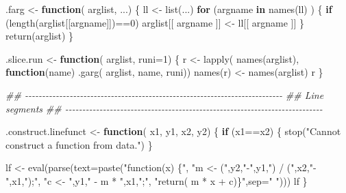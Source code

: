 \documentclass[
  letterpaper,
  DIV=11,
  numbers=noendperiod]{scrartcl}
\newenvironment{Shaded}{\begin{snugshade}}{\end{snugshade}}
\newcommand{\AttributeTok}[1]{\textcolor[rgb]{0.40,0.45,0.13}{#1}}
\newcommand{\ControlFlowTok}[1]{\textcolor[rgb]{0.00,0.23,0.31}{\textbf{#1}}}
\newcommand{\DecValTok}[1]{\textcolor[rgb]{0.68,0.00,0.00}{#1}}
\newcommand{\DocumentationTok}[1]{\textcolor[rgb]{0.37,0.37,0.37}{\textit{#1}}}
\newcommand{\FunctionTok}[1]{\textcolor[rgb]{0.28,0.35,0.67}{#1}}
\newcommand{\NormalTok}[1]{\textcolor[rgb]{0.00,0.23,0.31}{#1}}
\newcommand{\OtherTok}[1]{\textcolor[rgb]{0.00,0.23,0.31}{#1}}
\newcommand{\SpecialCharTok}[1]{\textcolor[rgb]{0.37,0.37,0.37}{#1}}
\newcommand{\StringTok}[1]{\textcolor[rgb]{0.13,0.47,0.30}{#1}}
\begin{document}
\begin{Shaded}
\begin{Highlighting}[]
\NormalTok{.farg }\OtherTok{\textless{}{-}} \ControlFlowTok{function}\NormalTok{( arglist, ...) \{}
\NormalTok{    ll }\OtherTok{\textless{}{-}} \FunctionTok{list}\NormalTok{(...)}
    \ControlFlowTok{for}\NormalTok{ (argname }\ControlFlowTok{in} \FunctionTok{names}\NormalTok{(ll) ) \{}
        \ControlFlowTok{if}\NormalTok{ (}\FunctionTok{length}\NormalTok{(arglist[[argname]])}\SpecialCharTok{==}\DecValTok{0}\NormalTok{)}
\NormalTok{          arglist[[ argname ]] }\OtherTok{\textless{}{-}}\NormalTok{ ll[[ argname ]]}
\NormalTok{    \}}
    \FunctionTok{return}\NormalTok{(arglist)}
\NormalTok{\}}

\NormalTok{.slice.run }\OtherTok{\textless{}{-}} \ControlFlowTok{function}\NormalTok{( arglist, }\AttributeTok{runi=}\DecValTok{1}\NormalTok{) \{}
\NormalTok{    r }\OtherTok{\textless{}{-}} \FunctionTok{lapply}\NormalTok{( }\FunctionTok{names}\NormalTok{(arglist), }\ControlFlowTok{function}\NormalTok{(name) }\FunctionTok{.garg}\NormalTok{( arglist, name, runi))}
    \FunctionTok{names}\NormalTok{(r) }\OtherTok{\textless{}{-}} \FunctionTok{names}\NormalTok{(arglist)}
\NormalTok{    r}
\NormalTok{\}}

\DocumentationTok{\#\# {-}{-}{-}{-}{-}{-}{-}{-}{-}{-}{-}{-}{-}{-}{-}{-}{-}{-}{-}{-}{-}{-}{-}{-}{-}{-}{-}{-}{-}{-}{-}{-}{-}{-}{-}{-}{-}{-}{-}{-}{-}{-}{-}{-}{-}{-}{-}{-}{-}{-}{-}{-}{-}{-}{-}{-}{-}{-}{-}{-}{-}{-}{-}{-}{-}{-}{-}{-}{-}{-}{-}{-}{-}{-}{-}}
\DocumentationTok{\#\# Line segments}
\DocumentationTok{\#\# {-}{-}{-}{-}{-}{-}{-}{-}{-}{-}{-}{-}{-}{-}{-}{-}{-}{-}{-}{-}{-}{-}{-}{-}{-}{-}{-}{-}{-}{-}{-}{-}{-}{-}{-}{-}{-}{-}{-}{-}{-}{-}{-}{-}{-}{-}{-}{-}{-}{-}{-}{-}{-}{-}{-}{-}{-}{-}{-}{-}{-}{-}{-}{-}{-}{-}{-}{-}{-}{-}{-}{-}{-}{-}{-}}

\NormalTok{.construct.linefunct }\OtherTok{\textless{}{-}} \ControlFlowTok{function}\NormalTok{( x1, y1, x2, y2) \{}
    \ControlFlowTok{if}\NormalTok{ (x1}\SpecialCharTok{==}\NormalTok{x2) \{}
        \FunctionTok{stop}\NormalTok{(}\StringTok{"Cannot construct a function from data."}\NormalTok{)}
\NormalTok{    \}}

\NormalTok{    lf }\OtherTok{\textless{}{-}} \FunctionTok{eval}\NormalTok{(}\FunctionTok{parse}\NormalTok{(}\AttributeTok{text=}\FunctionTok{paste}\NormalTok{(}\StringTok{"function(x) \{"}\NormalTok{,}
        \StringTok{"m \textless{}{-} ("}\NormalTok{,y2,}\StringTok{"{-}"}\NormalTok{,y1,}\StringTok{") / ("}\NormalTok{,x2,}\StringTok{"{-}"}\NormalTok{,x1,}\StringTok{");"}\NormalTok{,}
        \StringTok{"c \textless{}{-} "}\NormalTok{,y1,}\StringTok{" {-} m * "}\NormalTok{,x1,}\StringTok{";"}\NormalTok{,}
        \StringTok{"return( m * x + c)\}"}\NormalTok{,}\AttributeTok{sep=}\StringTok{" "}\NormalTok{)))}
\NormalTok{    lf}
\NormalTok{\}}


\end{Highlighting}
\end{Shaded}
\end{document}
